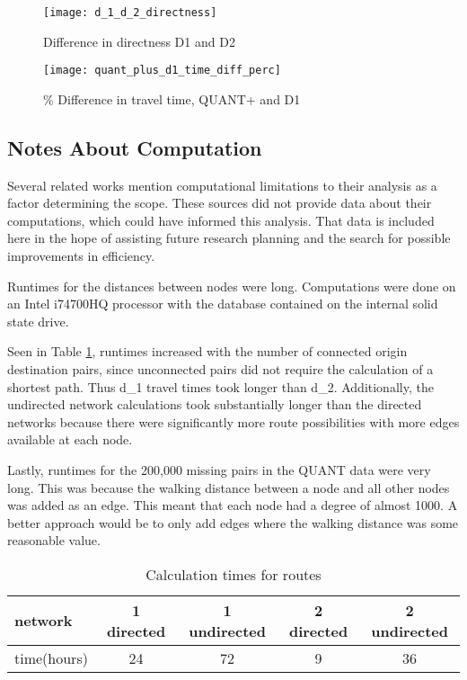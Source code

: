 \begin{figure}
\centering
\texttt{[image: d\_1\_d\_2\_directness]}
\caption{Difference in directness D1 and D2}
\label{fig:d1_d2_directness}
\end{figure}

\begin{figure}
\centering
\texttt{[image: quant\_plus\_d1\_time\_diff\_perc]}
\caption{\% Difference in travel time, QUANT+ and D1}
\label{fig:quant_d1_time}
\end{figure}

\subsection{Notes About Computation}

Several related works mention computational limitations to their analysis as a factor determining the scope. These sources did not provide data about their computations, which could have informed this analysis. That data is included here in the hope of assisting future research planning and the search for possible improvements in efficiency. 

Runtimes for the distances between nodes were long. Computations were done on an Intel i74700HQ processor with the database contained on the internal solid state drive. 

Seen in Table \ref{table:net_calc_times}, runtimes increased with the number of connected origin destination pairs, since unconnected pairs  did not require the calculation of a shortest path. Thus d\_1 travel times took longer than d\_2. Additionally, the undirected network calculations took substantially longer than the directed networks because there were significantly more route possibilities with more edges available at each node. 

Lastly, runtimes for the 200,000 missing pairs in the QUANT data were very long. This was because the walking distance between a node and all other nodes was added as an edge. This meant that each node had a degree of almost 1000. A better approach would be to only add edges where the walking distance was some reasonable value. 




\begin{table}[]
\centering
\begin{tabular}{@{}lcccc@{}}
network     & 1 directed  & 1 undirected & 2 directed  & 2 undirected \\ 
\midrule
time(hours) & 24 & 72  & 9 & 36 \\ \bottomrule
\end{tabular}
\caption{Calculation times for routes}
\label{table:net_calc_times}
\end{table}

